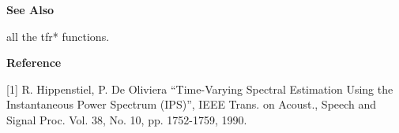 {\bf \large \sf See Also}\\
\hspace*{1.5cm}
\begin{minipage}[t]{13.5cm}
all the {\ty tfr*} functions.
\end{minipage}
\vspace*{.2cm}


{\bf \large \sf Reference}\\
\hspace*{1.5cm}
\begin{minipage}[t]{13.5cm}
[1] R. Hippenstiel, P. De Oliviera ``Time-Varying Spectral Estimation Using
the Instantaneous Power Spectrum (IPS)'', IEEE Trans. on Acoust., Speech and
Signal Proc. Vol. 38, No. 10, pp. 1752-1759, 1990.
\end{minipage}
